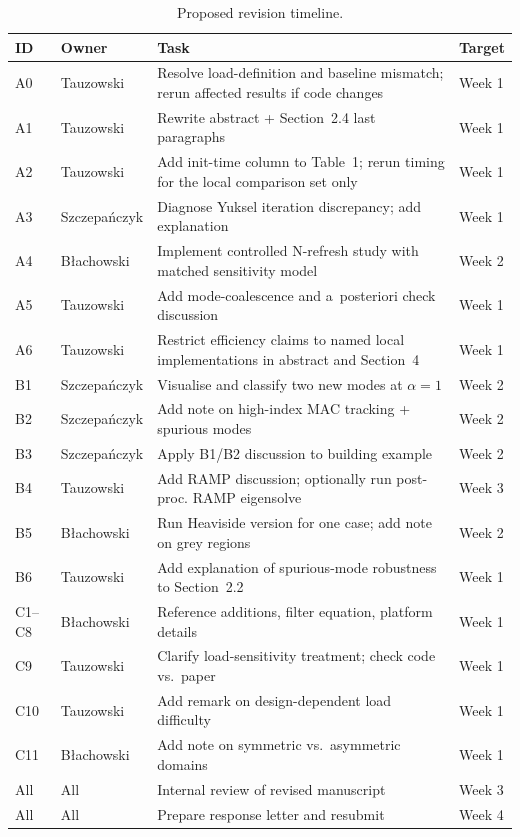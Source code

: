 \documentclass[12pt,a4paper]{article}
\begin{document}
\begin{table}[htbp]
\centering
\caption{Proposed revision timeline.}
\label{tab:timeline}
\renewcommand\arraystretch{1.2}
\begin{tabularx}{\textwidth}{@{}p{0.5cm}p{2.5cm}p{9cm}p{1.8cm}@{}}
\toprule
ID & Owner & Task & Target \\
\midrule
A0 & Tauzowski & Resolve load-definition and baseline mismatch; rerun affected results if code changes & Week 1 \\
A1 & Tauzowski & Rewrite abstract + Section~2.4 last paragraphs & Week 1 \\
A2 & Tauzowski & Add init-time column to Table~1; rerun timing for the local comparison set only & Week 1 \\
A3 & Szczepańczyk & Diagnose Yuksel iteration discrepancy; add explanation & Week 1 \\
A4 & Błachowski  & Implement controlled N-refresh study with matched sensitivity model & Week 2 \\
A5 & Tauzowski & Add mode-coalescence and a~posteriori check discussion & Week 1 \\
A6 & Tauzowski & Restrict efficiency claims to named local implementations in abstract and Section~4 & Week 1 \\
\midrule
B1 & Szczepańczyk & Visualise and classify two new modes at $\alpha=1$ & Week 2 \\
B2 & Szczepańczyk & Add note on high-index MAC tracking + spurious modes & Week 2 \\
B3 & Szczepańczyk & Apply B1/B2 discussion to building example & Week 2 \\
B4 & Tauzowski & Add RAMP discussion; optionally run post-proc. RAMP eigensolve & Week 3 \\
B5 & Błachowski  & Run Heaviside version for one case; add note on grey regions & Week 2 \\
B6 & Tauzowski & Add explanation of spurious-mode robustness to Section~2.2 & Week 1 \\
\midrule
C1--C8 & Błachowski  & Reference additions, filter equation, platform details & Week 1 \\
C9     & Tauzowski   & Clarify load-sensitivity treatment; check code vs.\ paper & Week 1 \\
C10    & Tauzowski   & Add remark on design-dependent load difficulty & Week 1 \\
C11    & Błachowski  & Add note on symmetric vs.\ asymmetric domains & Week 1 \\
\midrule
All    & All         & Internal review of revised manuscript & Week 3 \\
All    & All         & Prepare response letter and resubmit & Week 4 \\
\bottomrule
\end{tabularx}
\end{table}
\end{document}
